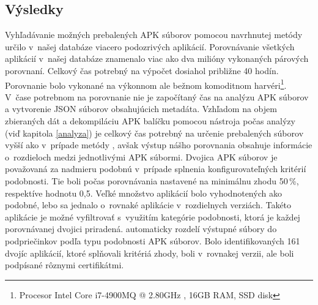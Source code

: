 \subsection{Výsledky}
Vyhľadávanie možných prebalených APK súborov pomocou navrhnutej metódy určilo v~našej databáze viacero podozrivých aplikácií. Porovnávanie všetkých aplikácií v~našej databáze znamenalo viac ako dva milióny vykonaných párových porovnaní. Celkový čas potrebný na výpočet dosiahol približne 40 hodín. Porovnanie bolo vykonané na výkonnom ale bežnom komoditnom harvéri\footnote{Procesor Intel Core i7-4900MQ @ 2.80GHz , 16GB RAM, SSD disk}. V~čase potrebnom na porovnanie nie je započítaný čas na analýzu APK súborov a vytvorenie JSON súborov obsahujúcich metadáta. Vzhľadom na objem zbieraných dát a dekompiláciu APK balíčku pomocou nástroja  počas analýzy (viď kapitola \ref{analyza}) je celkový čas potrebný na určenie prebalených súborov vyšší ako v~prípade metódy , avšak výstup nášho porovnania obsahuje informácie o~rozdieloch medzi jednotlivými APK súbormi. Dvojica APK súborov je považovaná za nadmieru podobnú v~prípade splnenia konfigurovateľných kritérií podobnosti. Tie boli počas porovnávania nastavené na minimálnu zhodu 50\,\%, respektíve hodnotu  0,5. Veľké množstvo aplikácií bolo vyhodnotených ako podobné, lebo sa jednalo o~rovnaké aplikácie v~rozdielnych verziách. Takéto aplikácie je možné vyfiltrovať s~využitím kategórie podobnosti, ktorá je každej porovnávanej dvojici priradená.  automaticky rozdelí výstupné súbory do podpriečinkov podľa typu podobnosti APK súborov. Bolo identifikovaných 161 dvojíc aplikácií, ktoré splňovali kritériá zhody, boli v~rovnakej verzii, ale boli podpísané rôznymi certifikátmi.